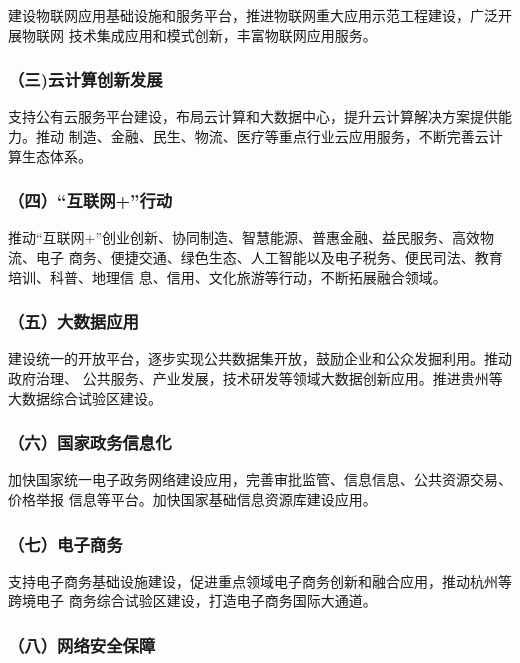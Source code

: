 \documentclass[11pt]{ctexart}
\begin{document}
{{{{建设物联网应用基础设施和服务平台，推进物联网重大应用示范工程建设，广泛开展物联网
技术集成应用和模式创新，丰富物联网应用服务。

\subsubsection{（三)云计算创新发展}
\label{sec:org5fd4582}

支持公有云服务平台建设，布局云计算和大数据中心，提升云计算解决方案提供能力。推动
制造、金融、民生、物流、医疗等重点行业云应用服务，不断完善云计算生态体系。

\subsubsection{（四）“互联网+”行动}
\label{sec:org216d26f}

推动“互联网+”创业创新、协同制造、智慧能源、普惠金融、益民服务、高效物流、电子
商务、便捷交通、绿色生态、人工智能以及电子税务、便民司法、教育培训、科普、地理信
息、信用、文化旅游等行动，不断拓展融合领域。

\subsubsection{（五）大数据应用}
\label{sec:org1efc905}

建设统一的开放平台，逐步实现公共数据集开放，鼓励企业和公众发掘利用。推动政府治理、
公共服务、产业发展，技术研发等领域大数据创新应用。推进贵州等大数据综合试验区建设。

\subsubsection{（六）国家政务信息化}
\label{sec:org3844f14}

加快国家统一电子政务网络建设应用，完善审批监管、信息信息、公共资源交易、价格举报
信息等平台。加快国家基础信息资源库建设应用。

\subsubsection{（七）电子商务}
\label{sec:org0dc64ba}

支持电子商务基础设施建设，促进重点领域电子商务创新和融合应用，推动杭州等跨境电子
商务综合试验区建设，打造电子商务国际大通道。

\subsubsection{（八）网络安全保障}
\label{sec:orgd1c63db}

}}}}
\end{document}

